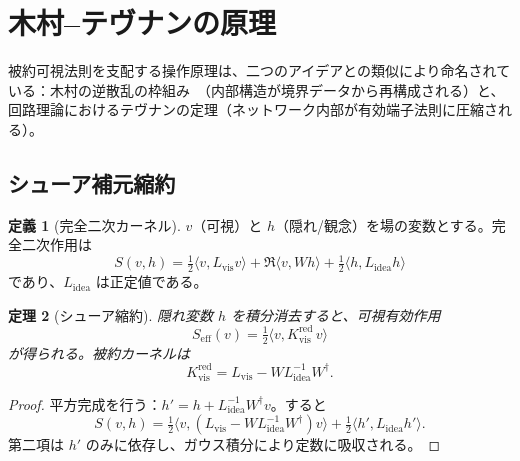 \documentclass[12pt]{article}
\theoremstyle{plain}
\newtheorem{theorem}{定理}[section]
\theoremstyle{definition}
\newtheorem{definition}[theorem]{定義}
\numberwithin{equation}{section}
\newcommand{\red}{\mathrm{red}}
\newcommand{\vis}{\mathrm{vis}}
\newcommand{\idea}{\mathrm{idea}}
\begin{document}
\section{木村--テヴナンの原理}\label{sec:KT}

被約可視法則を支配する操作原理は、二つのアイデアとの類似により命名されている：木村の逆散乱の枠組み~\cite{Kimura2020,Kimura2021,Kimura2022}（内部構造が境界データから再構成される）と、回路理論におけるテヴナンの定理（ネットワーク内部が有効端子法則に圧縮される）。

\subsection{シューア補元縮約}

\begin{definition}[完全二次カーネル]
$v$（可視）と $h$（隠れ/観念）を場の変数とする。完全二次作用は
\begin{equation}
S(v,h) = \tfrac{1}{2}\langle v, L_{\vis} v\rangle + \Re\langle v, Wh\rangle + \tfrac{1}{2}\langle h, L_{\idea} h\rangle
\end{equation}
であり、$L_{\idea}$ は正定値である。
\end{definition}

\begin{theorem}[シューア縮約]\label{thm:schur}
隠れ変数 $h$ を積分消去すると、可視有効作用
\begin{equation}
S_{\mathrm{eff}}(v) = \tfrac{1}{2}\langle v, K_{\vis}^{\red}\, v\rangle
\end{equation}
が得られる。被約カーネルは
\begin{equation}
\boxed{K_{\vis}^{\red} = L_{\vis} - W L_{\idea}^{-1} W^\dagger.}
\end{equation}
\end{theorem}

\begin{proof}
平方完成を行う：$h'=h+L_{\idea}^{-1}W^\dagger v$。すると
\begin{equation}
S(v,h) = \tfrac{1}{2}\langle v,(L_{\vis}-WL_{\idea}^{-1}W^\dagger)v\rangle + \tfrac{1}{2}\langle h',L_{\idea} h'\rangle.
\end{equation}
第二項は $h'$ のみに依存し、ガウス積分により定数に吸収される。
\end{proof}
\end{document}
